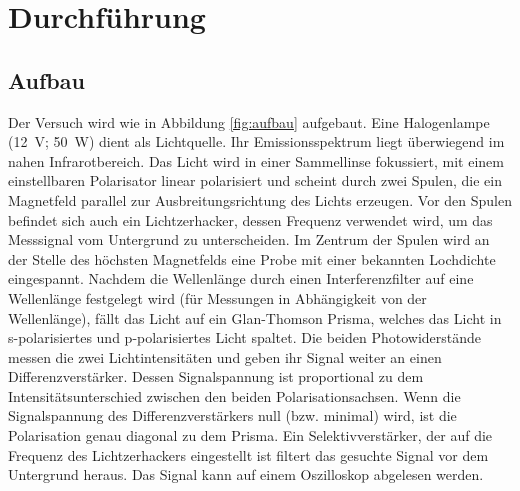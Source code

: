 






\section{Durchführung \cite{man}}
\subsection{Aufbau}
Der Versuch wird wie in Abbildung \ref{fig:aufbau} aufgebaut. Eine Halogenlampe
(\qty{12}{\V}; \qty{50}{\W}) dient als Lichtquelle. Ihr Emissionsspektrum liegt
überwiegend im nahen Infrarotbereich. Das Licht wird in einer Sammellinse
fokussiert, mit einem einstellbaren Polarisator linear polarisiert und scheint
durch zwei Spulen, die ein Magnetfeld parallel zur Ausbreitungsrichtung des
Lichts erzeugen. Vor den Spulen befindet sich auch ein Lichtzerhacker, dessen
Frequenz verwendet wird, um das Messsignal vom Untergrund zu unterscheiden. Im
Zentrum der Spulen wird an der Stelle des höchsten Magnetfelds eine Probe mit
einer bekannten Lochdichte eingespannt. Nachdem die Wellenlänge durch einen
Interferenzfilter auf eine Wellenlänge festgelegt wird (für Messungen in
Abhängigkeit von der Wellenlänge), fällt das Licht auf ein Glan-Thomson Prisma,
welches das Licht in s-polarisiertes und p-polarisiertes Licht spaltet. Die
beiden Photowiderstände messen die zwei Lichtintensitäten und geben ihr Signal
weiter an einen Differenzverstärker. Dessen Signalspannung ist proportional zu
dem Intensitätsunterschied zwischen den beiden Polarisationsachsen. Wenn die
Signalspannung des Differenzverstärkers null (bzw. minimal) wird, ist die
Polarisation genau diagonal zu dem Prisma. Ein Selektivverstärker, der auf die
Frequenz des Lichtzerhackers eingestellt ist filtert das gesuchte Signal vor
dem Untergrund heraus. Das Signal kann auf einem Oszilloskop abgelesen werden.%

